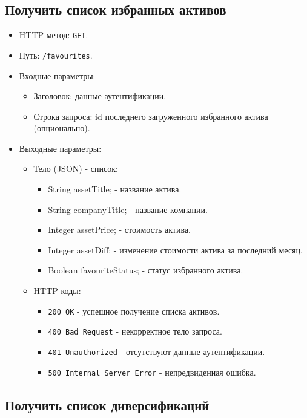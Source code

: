 \documentclass[a4paper, 14pt]{article}
\begin{document}
\subsection{Получить список избранных активов}

\begin{itemize}
    \item HTTP метод: \texttt{GET}.
    \item Путь: \texttt{/favourites}.
    \item Входные параметры:
    \begin{itemize}
        \item Заголовок: данные аутентификации.
        \item Строка запроса: id последнего загруженного избранного актива (опционально).
    \end{itemize}
    \item Выходные параметры:
    \begin{itemize}
        \item Тело (JSON) - список:
        \begin{itemize}
            \item String assetTitle; - название актива.
            \item String companyTitle; - название компании.
            \item Integer assetPrice; - стоимость актива.
            \item Integer assetDiff; - изменение стоимости актива за последний месяц.
            \item Boolean favouriteStatus; - статус избранного актива.
        \end{itemize}
        \item HTTP коды:
        \begin{itemize}
            \item \texttt{200 OK} - успешное получение списка активов.
            \item \texttt{400 Bad Request} - некорректное тело запроса.
            \item \texttt{401 Unauthorized} - отсутствуют данные аутентификации.
            \item \texttt{500 Internal Server Error} - непредвиденная ошибка.
        \end{itemize}
    \end{itemize}
\end{itemize}

\subsection{Получить список диверсификаций}
\end{document}
